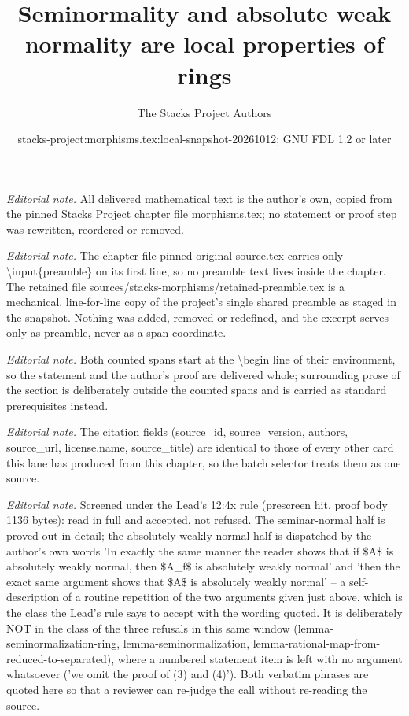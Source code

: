 \documentclass[10pt,a4paper]{amsart}
\title{Seminormality and absolute weak normality are local properties of rings}
\author{The Stacks Project Authors}
\date{stacks-project:morphisms.tex:local-snapshot-20261012; GNU FDL 1.2 or later}
\theoremstyle{plain}
\theoremstyle{definition}
\theoremstyle{remark}
\numberwithin{equation}{subsection}
\begin{document}
\maketitle
\setcounter{subsection}{1}
\noindent\textit{Editorial note.} All delivered mathematical text is the author's own, copied from the pinned Stacks Project chapter file morphisms.tex; no statement or proof step was rewritten, reordered or removed.\par\medskip
\noindent\textit{Editorial note.} The chapter file pinned-original-source.tex carries only \textbackslash{}input\{preamble\} on its first line, so no preamble text lives inside the chapter. The retained file sources/stacks-morphisms/retained-preamble.tex is a mechanical, line-for-line copy of the project's single shared preamble as staged in the snapshot. Nothing was added, removed or redefined, and the excerpt serves only as preamble, never as a span coordinate.\par\medskip
\noindent\textit{Editorial note.} Both counted spans start at the \textbackslash{}begin line of their environment, so the statement and the author's proof are delivered whole; surrounding prose of the section is deliberately outside the counted spans and is carried as standard prerequisites instead.\par\medskip
\noindent\textit{Editorial note.} The citation fields (source\_id, source\_version, authors, source\_url, license.name, source\_title) are identical to those of every other card this lane has produced from this chapter, so the batch selector treats them as one source.\par\medskip
\noindent\textit{Editorial note.} Screened under the Lead's 12:4x rule (prescreen hit, proof body 1136 bytes): read in full and accepted, not refused. The seminar-normal half is proved out in detail; the absolutely weakly normal half is dispatched by the author's own words 'In exactly the same manner the reader shows that if \$A\$ is absolutely weakly normal, then \$A\_f\$ is absolutely weakly normal' and 'then the exact same argument shows that \$A\$ is absolutely weakly normal' -- a self-description of a routine repetition of the two arguments given just above, which is the class the Lead's rule says to accept with the wording quoted. It is deliberately NOT in the class of the three refusals in this same window (lemma-seminormalization-ring, lemma-seminormalization, lemma-rational-map-from-reduced-to-separated), where a numbered statement item is left with no argument whatsoever ('we omit the proof of (3) and (4)'). Both verbatim phrases are quoted here so that a reviewer can re-judge the call without re-reading the source.\par\medskip
\end{document}
